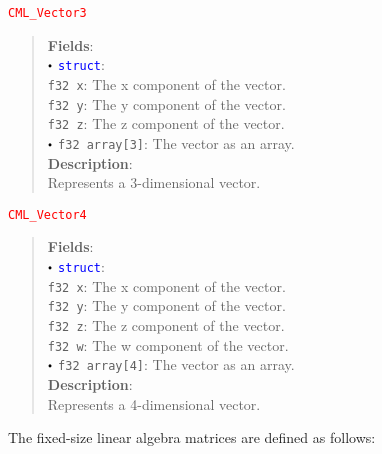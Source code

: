 \documentclass[a4paper,oneside,8pt]{extarticle}
\newcommand{\union}[1]{
  \noindent\textcolor{red}{\texttt{#1}}
  \vspace{-0.3em}
}
\renewcommand{\dot}{\raisebox{0.3ex}{\scalebox{0.6}{$\bullet$}}}
\theoremstyle{definition}
\begin{document}
\union{CML\_Vector3}
\begin{quote}
  \textbf{Fields}: \\
  $\dot$ \textcolor{blue}{\texttt{struct}}: \\
  \indent\hspace{1em} \texttt{f32 x}: The x component of the vector. \\
  \indent\hspace{1em} \texttt{f32 y}: The y component of the vector. \\
  \indent\hspace{1em} \texttt{f32 z}: The z component of the vector. \\
  $\dot$ \texttt{f32 array[3]}: The vector as an array. \\

  \vspace{-0.75em}
  \textbf{Description}: \\
  Represents a 3-dimensional vector. \\
\end{quote}

\union{CML\_Vector4}
\begin{quote}
  \textbf{Fields}: \\
  $\dot$ \textcolor{blue}{\texttt{struct}}: \\
  \indent\hspace{1em} \texttt{f32 x}: The x component of the vector. \\
  \indent\hspace{1em} \texttt{f32 y}: The y component of the vector. \\
  \indent\hspace{1em} \texttt{f32 z}: The z component of the vector. \\
  \indent\hspace{1em} \texttt{f32 w}: The w component of the vector. \\
  $\dot$ \texttt{f32 array[4]}: The vector as an array. \\

  \vspace{-0.75em}
  \textbf{Description}: \\
  Represents a 4-dimensional vector. \\
\end{quote}

The fixed-size linear algebra matrices are defined as follows: \newline
\end{document}
